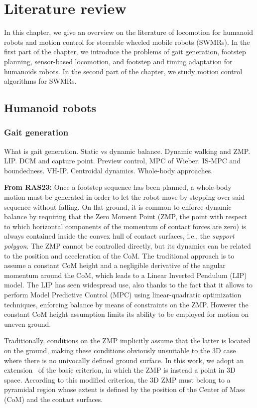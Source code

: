 \chapter{Literature review}
In this chapter, we give an overview on the literature of locomotion for
humanoid robots and motion control for
steerable wheeled mobile robots (SWMRs). In the first part of 
the chapter, we introduce the problems of 
gait generation, footstep planning, sensor-based locomotion, and footstep and 
timing adaptation for humanoids robots. In the second part of the chapter,
we study motion control algorithms for SWMRs.

\section{Humanoid robots}
\subsection{Gait generation}
What is gait generation. Static vs dynamic balance. Dynamic walking and ZMP.
LIP. DCM and capture point. Preview control, MPC of Wieber. IS-MPC and 
boundedness. VH-IP. Centroidal dynamics. Whole-body approaches.

\textbf{From RAS23:}
Once a footstep sequence has been planned, a whole-body motion must be generated in order to let the robot move by stepping over said sequence without falling. On flat ground, it is common to enforce dynamic balance by requiring that the Zero Moment Point (ZMP, the point with respect to which horizontal components of the momentum of contact forces are zero) is always contained inside the convex hull of contact surfaces, i.e., the \emph{support polygon}.
The ZMP cannot be controlled directly, but its dynamics can be related to the position and acceleration of the CoM. The traditional approach is to assume a constant CoM height and a negligible derivative of the angular momentum around the CoM, which leads to a Linear Inverted Pendulum (LIP)~\cite{Kajita2003BipedWalkingPatternGeneration} model. The LIP has seen widespread use, also thanks to the fact that it allows to perform Model Predictive Control (MPC) using linear-quadratic optimization techniques, enforcing balance by means of constraints on the ZMP. However the constant CoM height assumption limits its ability to be employed for motion on uneven ground.

Traditionally, conditions on the ZMP implicitly assume that the latter is located on the ground, making these conditions obviously unsuitable to the 3D case where there is no univocally defined ground surface. In this work, we adopt an extension~\cite{Sugihara2021ICRA} of the basic criterion, in which the ZMP is instead a point in 3D space. According to this modified criterion, the 3D ZMP must belong to a pyramidal region whose extent is defined by the position of the Center of Mass (CoM) and the contact surfaces.

